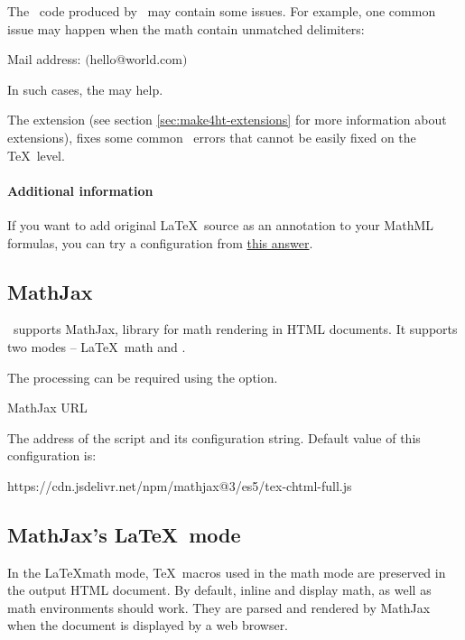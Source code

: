 The \mathml\ code produced by \texfourht\ may contain some issues. For example,
one common issue may happen when the math contain unmatched delimiters:

\begin{texsource}
 Mail address: $\lparen$hello@world.com$\rparen$
\end{texsource}

In such cases, the  may help. 

The 
extension (see section \ref{sec:make4ht-extensions} for more
information about  extensions), fixes some common \mathml\
errors that cannot be easily fixed on the \TeX\ level. 

\paragraph{Additional information}

If you want to add original \LaTeX\ source as an annotation to your MathML formulas,
you can try a configuration from \href{https://tex.stackexchange.com/a/637910/2891}{this answer}.

\subsection{MathJax}
\texfourht\ supports MathJax, library for math rendering in HTML documents. 
 It supports two modes -- \LaTeX\ math and \mathml.

The  processing can be required using the  option.

 {MathJax URL}\EndDoc

The address of the  script and its configuration string. Default value of this configuration is:

\begin{texsource}
{https://cdn.jsdelivr.net/npm/mathjax@3/es5/tex-chtml-full.js}
\end{texsource}

\subsection{MathJax's \LaTeX\ mode}



In the \LaTeX math mode, \TeX\ macros used in the math mode are preserved in
the output HTML document. 
By default, inline and display math, as well as math environments should work.
They are parsed and rendered by MathJax when the
document is displayed by a web browser.

